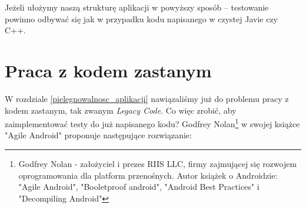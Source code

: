 Jeżeli ułożymy naszą strukturę aplikacji w powyższy sposób – testowanie powinno odbywać się jak w przypadku kodu napisanego w czystej Javie czy C++.

\section{Praca z kodem zastanym}
\label{legacy_code}
W rozdziale \ref{pielegnowalnosc_aplikacji} nawiązaliśmy już do problemu pracy z kodem zastanym, tak zwanym \textit{Legacy Code}.
Co więc zrobić, aby zaimplementować testy do już napisanego kodu? Godfrey Nolan\footnote{Godfrey Nolan - założyciel i prezes RIIS LLC, firmy zajmującej się rozwojem oprogramowania dla platform przenośnych. Autor książek o Androidzie: "Agile Android", "Booletproof android", "Android Best Practices" i "Decompiling Android"} w swojej książce "Agile Android"\cite{bib:agile:android} proponuje następujące rozwiązanie:

